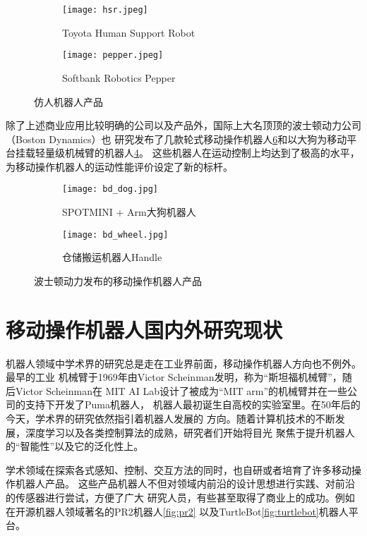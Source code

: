 \begin{figure}
\centering
\begin{subfigure}{.5\textwidth}
  \centering
  \texttt{[image: hsr.jpeg]}
  \caption{Toyota Human Support Robot}
  \label{fig:hsr}
\end{subfigure}%
\begin{subfigure}{.5\textwidth}
  \centering
  \texttt{[image: pepper.jpeg]}
  \caption{Softbank Robotics Pepper}
  \label{fig:pepper}
\end{subfigure}
\label{fig:hsr_pepper}
\caption{仿人机器人产品}
\end{figure}

除了上述商业应用比较明确的公司以及产品外，国际上大名顶顶的波士顿动力公司（Boston Dynamics）也
研究发布了几款轮式移动操作机器人\ref{fig:bd_wheel}和以大狗为移动平台挂载轻量级机械臂的机器人\ref{fig:bd_dog}。
这些机器人在运动控制上均达到了极高的水平，为移动操作机器人的运动性能评价设定了新的标杆。

\begin{figure}
\centering
\begin{subfigure}{.5\textwidth}
  \centering
  \texttt{[image: bd\_dog.jpg]}
  \caption{SPOTMINI + Arm大狗机器人}
  \label{fig:bd_dog}
\end{subfigure}%
\begin{subfigure}{.5\textwidth}
  \centering
  \texttt{[image: bd\_wheel.jpg]}
  \caption{仓储搬运机器人Handle}
  \label{fig:bd_wheel}
\end{subfigure}
\caption{波士顿动力发布的移动操作机器人产品}
\end{figure}


\section{移动操作机器人国内外研究现状}
\label{cha:research}

机器人领域中学术界的研究总是走在工业界前面，移动操作机器人方向也不例外。最早的工业
机械臂于1969年由Victor Scheinman发明，称为“斯坦福机械臂”，随后Victor Scheinman在
MIT AI Lab设计了被成为“MIT arm”的机械臂并在一些公司的支持下开发了Puma机器人\cite{huangxihuanReview}，
机器人最初诞生自高校的实验室里。在50年后的今天，学术界的研究依然指引着机器人发展的
方向。随着计算机技术的不断发展，深度学习以及各类控制算法的成熟，研究者们开始将目光
聚焦于提升机器人的“智能性”以及它的泛化性上。

学术领域在探索各式感知、控制、交互方法的同时，也自研或者培育了许多移动操作机器人产品。
这些产品机器人不但对领域内前沿的设计思想进行实践、对前沿的传感器进行尝试，方便了广大
研究人员，有些甚至取得了商业上的成功。例如在开源机器人领域著名的PR2机器人\ref{fig:pr2}
以及TurtleBot\ref{fig:turtlebot}机器人平台。

